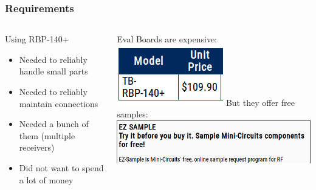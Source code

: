\documentclass[]{beamer}
\begin{document}
\begin{frame}
    \frametitle{Requirements}
    \begin{columns}[T]
        \begin{column}[T]{5cm}
            {\large Using RBP-140+}
            \begin{itemize}
                \item{Needed to reliably handle small parts}
                \item{Needed to reliably maintain connections}
                \item{Needed a bunch of them (multiple receivers)}
                \item{Did not want to spend a lot of money}
            \end{itemize}
        \end{column}
        \begin{column}[T]{5cm}
            Eval Boards are expensive:\\
            \includegraphics[keepaspectratio,scale=0.75]{images/eval_board.png}
            But they offer free samples:\\
            \includegraphics[keepaspectratio,scale=0.25]{images/ezsample.png}\\
        \end{column}
    \end{columns}
\end{frame}
\end{document}
